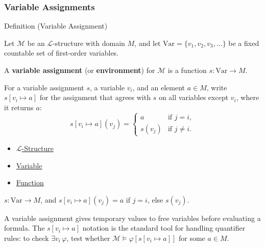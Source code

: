 
\subsubsection*{Variable Assignments}

\begin{definitionbox}{Definition (Variable Assignment)}
\begin{definition}\label{def:variable-assignment}
Let $\mathcal{M}$ be an $\mathcal{L}$-structure with domain $M$, and let
$\mathrm{Var} = \{v_1, v_2, v_3, \ldots\}$ be a fixed countable set of
first-order variables.

A \textbf{variable assignment} (or \textbf{environment}) for $\mathcal{M}$
is a function $s : \mathrm{Var} \to M$.

For a variable assignment $s$, a variable $v_i$, and an element $a \in M$,
write $s[v_i \mapsto a]$ for the assignment that agrees with $s$ on all
variables except $v_i$, where it returns $a$:
\[
  s[v_i \mapsto a](v_j) =
  \begin{cases}
    a      & \text{if } j = i, \\
    s(v_j) & \text{if } j \neq i.
  \end{cases}
\]
\end{definition}
\end{definitionbox}

\begin{dependencies}
\begin{itemize}
  \item \hyperref[def:l-structure]{$\mathcal{L}$-Structure}
  \item \hyperref[def:variable]{Variable}
  \item \hyperref[def:function]{Function}
\end{itemize}
\end{dependencies}

\begin{remark*}
$s : \mathrm{Var} \to M$, and
$s[v_i \mapsto a](v_j) = a$ if $j = i$, else $s(v_j)$.
\end{remark*}

\begin{remark*}[Intuition]
A variable assignment gives temporary values to free variables before
evaluating a formula. The $s[v_i \mapsto a]$ notation is the standard
tool for handling quantifier rules: to check $\exists v_i\,\varphi$,
test whether $\mathcal{M} \models \varphi[s[v_i \mapsto a]]$ for some
$a \in M$.
\end{remark*}

